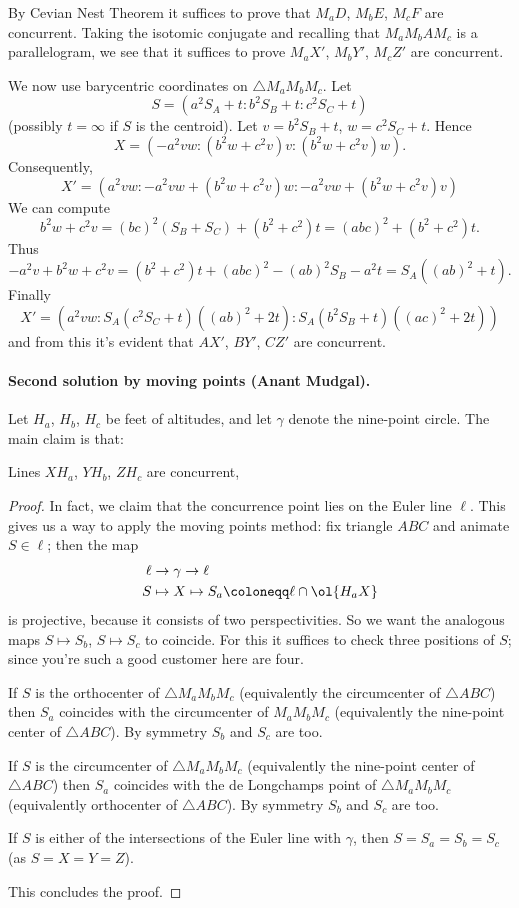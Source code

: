 \documentclass[11pt]{scrartcl}
\begin{document}
By Cevian Nest Theorem it suffices to
prove that $M_a D$, $M_b E$, $M_c F$ are concurrent.
Taking the isotomic conjugate and recalling that
$M_a M_b A M_c$ is a parallelogram,
we see that it suffices to prove
$M_a X'$, $M_b Y'$, $M_c Z'$ are concurrent.

We now use barycentric coordinates on $\triangle M_a M_b M_c$.
Let \[ S = \left( a^2S_A + t : b^2S_B + t : c^2S_C + t \right) \]
(possibly $t=\infty$ if $S$ is the centroid).
Let $v = b^2S_B+t$, $w=c^2S_C+t$.
Hence \[ X = \left( -a^2 vw : (b^2w+c^2v)v : (b^2w+c^2v)w \right). \]
Consequently,
\[ X' = \left( a^2vw : -a^2vw + (b^2w+c^2v)w : -a^2vw + (b^2w+c^2v)v \right) \]
We can compute
\[ b^2w+c^2v = (bc)^2(S_B+S_C)+ (b^2+c^2)t = (abc)^2 + (b^2+c^2)t. \]
Thus
\[ -a^2v+b^2w+c^2v
  = (b^2+c^2)t + (abc)^2 - (ab)^2S_B - a^2t =
  S_A( (ab)^2 +t ). \]
Finally
\[ X' = \left( a^2vw :
  S_A (c^2S_C+t) \left( (ab)^2 +2t \right) :
  S_A (b^2S_B+t) \left( (ac)^2 +2t \right)
  \right) \]
and from this it's evident that $AX'$, $BY'$, $CZ'$ are concurrent.

\paragraph{Second solution by moving points (Anant Mudgal).}
Let $H_a$, $H_b$, $H_c$ be feet of altitudes,
and let $\gamma$ denote the nine-point circle.
The main claim is that:
\begin{claim*}
  Lines $XH_a$, $YH_b$, $ZH_c$ are concurrent,
\end{claim*}
\begin{proof}
  In fact, we claim that the concurrence point lies on the Euler line $\ell$.
  This gives us a way to apply the moving points method:
  fix triangle $ABC$ and animate $S \in \ell$;
  then the map
  \begin{align*}
    \ell & \to \gamma \to \ell \\
    S &\mapsto X \mapsto S_a \coloneqq \ell \cap \ol{H_a X}
  \end{align*}
  is projective, because it consists of two perspectivities.
  So we want the analogous maps $S \mapsto S_b$, $S \mapsto S_c$ to coincide.
  For this it suffices to check three positions of $S$;
  since you're such a good customer here are four.
  \begin{itemize}
    \ii If $S$ is the orthocenter of $\triangle M_a M_b M_c$
    (equivalently the circumcenter of $\triangle ABC$)
    then $S_a$ coincides with the circumcenter of $M_a M_b M_c$
    (equivalently the nine-point center of $\triangle ABC$).
    By symmetry $S_b$ and $S_c$ are too.

    \ii If $S$ is the circumcenter of $\triangle M_a M_b M_c$
    (equivalently the nine-point center of $\triangle ABC$)
    then $S_a$ coincides with the de Longchamps point of $\triangle M_a M_b M_c$
    (equivalently orthocenter of $\triangle ABC$).
    By symmetry $S_b$ and $S_c$ are too.

    \ii If $S$ is either of the intersections of the Euler
    line with $\gamma$, then $S = S_a = S_b = S_c$
    (as $S = X = Y = Z$).
  \end{itemize}
  This concludes the proof.
\end{proof}
\end{document}
